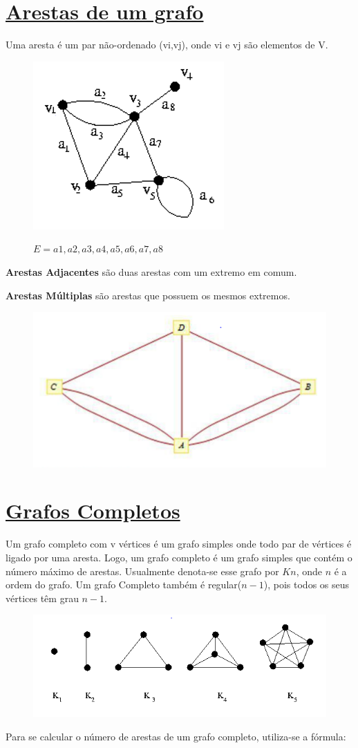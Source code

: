 \documentclass{article}
\begin{document}
	\section{{\Large \underline{Arestas de um grafo}}}
		Uma aresta é um par não-ordenado (vi,vj), onde vi e vj são elementos de V.
		
\begin{figure}[H]
	\centering
	\includegraphics[width=0.3\linewidth]{"Figuras/arestas1"}
	\label{fig:arestas1}
	\caption{{\small $E = {a1, a2, a3, a4, a5, a6, a7, a8}$}}
\end{figure}
	\vspace*{0.3cm}
	\textbf{Arestas Adjacentes} são duas arestas com um extremo em comum.
	
	\textbf{Arestas Múltiplas} são arestas que possuem os mesmos extremos.
	
\begin{figure}[H]
	\centering
	\includegraphics[width=0.3\linewidth]{"Figuras/arestas2"}
	\label{fig:arestas2}
	\caption{}
\end{figure}\vspace*{0.3cm}

	\section{{\Large \underline{Grafos Completos}}}
		\vspace*{0.3cm}
		Um grafo completo com v vértices é um grafo simples onde todo par de vértices é ligado por uma aresta. Logo, um grafo completo é um grafo simples que contém o número máximo de arestas. Usualmente denota-se esse grafo por $Kn$, onde $n$ é a ordem do grafo.
		\newpage
		Um grafo Completo também é regular($n-1$), pois todos os seus vértices têm grau $n-1$.
		
\begin{figure}[H]
	\centering
	\includegraphics[width=0.5\linewidth]{"Figuras/completo"}
	\label{fig:completo}
	\caption{}
\end{figure}\vspace*{0.2cm}
		Para se calcular o número de arestas de um grafo completo, utiliza-se a fórmula:
\end{document}

